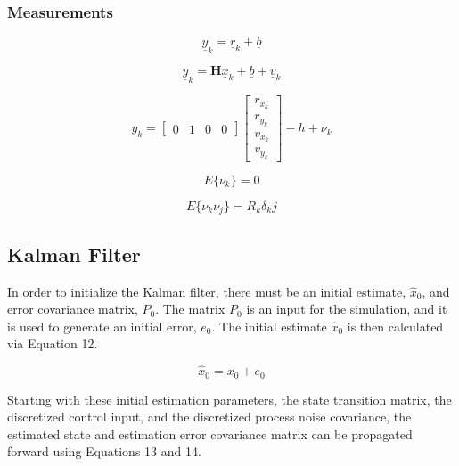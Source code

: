 \documentclass{article}
\begin{document}
\subsubsection{Measurements}

\begin{equation}
    \underline{y}_k = \underline{r}_k + \underline{b}
\end{equation}

\begin{equation}
    \underline{y}_k = \mathbf{H}\underline{x}_k + \underline{b} + \underline{v}_k
\end{equation}

\begin{equation*}
    y_k = 
    \begin{bmatrix}
        0 & 1 & 0 & 0
    \end{bmatrix}
    \begin{bmatrix} r_{x_k} \\r_{y_k} \\v_{x_k} \\v_{y_k} \end{bmatrix} - h + \nu_k
\end{equation*}

\begin{equation*}
    E\{\nu_k\} = 0
\end{equation*}

\begin{equation*}
    E\{\nu_k \nu_j\} = R_k\delta_kj
\end{equation*}

\subsection{Kalman Filter}
In order to initialize the Kalman filter, there must be an initial estimate, $\hat{x}_0$, and error covariance matrix, $P_0$. The matrix $P_0$ is an input for the simulation, and it is used to generate an initial error, $e_0$. The initial estimate $\hat{x}_0$ is then calculated via Equation 12.

\begin{equation}
    \hat{x}_0 = x_0 + e_0
\end{equation}

Starting with these initial estimation parameters, the state transition matrix, the discretized control input, and the discretized process noise covariance, the estimated state and estimation error covariance matrix can be propagated forward using Equations 13 and 14. 
\end{document}

